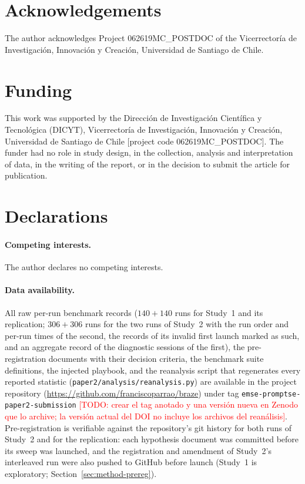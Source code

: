 \documentclass[smallcondensed,natbib]{svjour3}
\newcommand{\todo}[1]{\textcolor{red}{[TODO: #1]}}
\begin{document}
\section*{Acknowledgements}
The author acknowledges Project 062619MC\_POSTDOC of the
Vicerrector\'ia de Investigaci\'on, Innovaci\'on y Creaci\'on,
Universidad de Santiago de Chile.

\section*{Funding}

This work was supported by the Direcci\'on de
Investigaci\'on Cient\'ifica y Tecnol\'ogica (DICYT),
Vicerrector\'ia de Investigaci\'on, Innovaci\'on y Creaci\'on,
Universidad de Santiago de Chile [project code 062619MC\_POSTDOC].
The funder had no role in study design, in the collection, analysis
and interpretation of data, in the writing of the report, or in the
decision to submit the article for publication.

\section*{Declarations}

\paragraph{Competing interests.} The author declares no competing
interests.

\paragraph{Data availability.} All raw per-run benchmark records
($140+140$ runs for Study~1 and its replication; $306+306$ runs for the
two runs of Study~2 with the run order and per-run times of the
second, the records of its invalid first launch marked as such, and an
aggregate record of the diagnostic sessions of the first), the
pre-registration documents with their decision criteria, the
benchmark suite definitions, the injected playbook, and the
reanalysis script that regenerates every reported statistic
(\texttt{paper2/analysis/reanalysis.py}) are available in the project
repository (\url{https://github.com/franciscoparrao/braze}) under tag
\texttt{emse-promptse-paper2-submission}
\todo{crear el tag anotado y una versión nueva en Zenodo que lo
archive; la versión actual del DOI no incluye los archivos del
reanálisis}.
Pre-registration is verifiable against the repository's git history
for both runs of Study~2 and for the replication: each hypothesis
document was committed before its sweep was launched, and the
registration and amendment of Study~2's interleaved run were also
pushed to GitHub before launch (Study~1 is exploratory;
Section~\ref{sec:method-prereg}).
\end{document}

